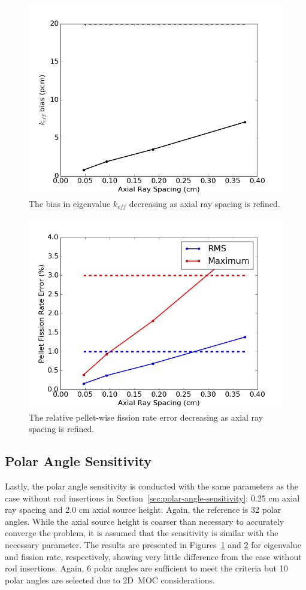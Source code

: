 \begin{figure}[h!]
	\centering
	\includegraphics[width=0.7\linewidth]{figures/results/sensitivity/rodded_z_spacing_pcm.png}
	\caption[]{The bias in eigenvalue $k_{\textit{eff}}$ decreasing as axial ray spacing is refined.}
	\label{fig:rodded-axial-rs-pcm}
\end{figure}
\begin{figure}[h!]
	\centering
	\includegraphics[width=0.7\linewidth]{figures/results/sensitivity/rodded_z_spacing_fr.png}
	\caption[]{The relative pellet-wise fission rate error decreasing as axial ray spacing is refined.}
	\label{fig:rodded-axial-rs-fr}
\end{figure}

\subsection{Polar Angle Sensitivity}

Lastly, the polar angle sensitivity is conducted with the same parameters as the case without rod insertions in Section~\ref{sec:polar-angle-sensitivity}: 0.25 cm axial ray spacing and 2.0 cm axial source height. Again, the reference is 32 polar angles. While the axial source height is coarser than necessary to accurately converge the problem, it is assumed that the sensitivity is similar with the necessary parameter. The results are presented in Figures~\ref{fig:rodded-axial-rs-pcm} and \ref{fig:rodded-axial-rs-fr} for eigenvalue and fission rate, respectively, showing very little difference from the case without rod insertions. Again, 6 polar angles are sufficient to meet the criteria but 10 polar angles are selected due to 2D~\ac{MOC} considerations.

